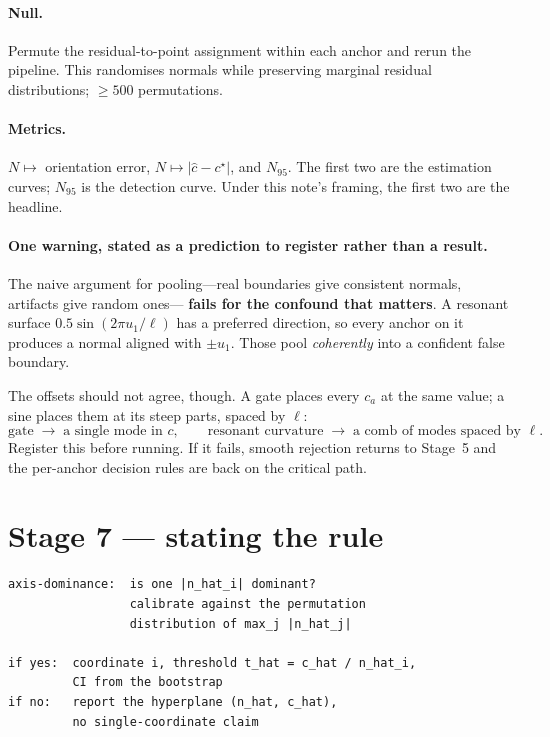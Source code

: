 \documentclass[11pt]{article}
\newcommand{\chat}{\hat{c}}
\begin{document}
\paragraph{Null.} Permute the residual-to-point assignment within each anchor and rerun the
pipeline. This randomises normals while preserving marginal residual distributions;
$\ge 500$ permutations.

\paragraph{Metrics.} $N \mapsto$ orientation error, $N \mapsto |\chat - c^\star|$, and $N_{95}$.
The first two are the estimation curves; $N_{95}$ is the detection curve. Under this note's
framing, the first two are the headline.

\paragraph{One warning, stated as a prediction to register rather than a result.} The naive
argument for pooling---real boundaries give consistent normals, artifacts give random ones---
\textbf{fails for the confound that matters}. A resonant surface $0.5\sin(2\pi u_1/\ell)$ has a
preferred direction, so every anchor on it produces a normal aligned with $\pm u_1$. Those pool
\emph{coherently} into a confident false boundary.

The offsets should not agree, though. A gate places every $c_a$ at the same value; a sine places
them at its steep parts, spaced by $\ell$:
\[
  \text{gate} \;\longrightarrow\; \text{a single mode in } c,
  \qquad
  \text{resonant curvature} \;\longrightarrow\; \text{a comb of modes spaced by } \ell .
\]
Register this before running. If it fails, smooth rejection returns to Stage~5 and the per-anchor
decision rules are back on the critical path.

\section{Stage 7 --- stating the rule}
\label{sec:stage7}

\begin{codebox}
\begin{verbatim}
axis-dominance:  is one |n_hat_i| dominant?
                 calibrate against the permutation
                 distribution of max_j |n_hat_j|

if yes:  coordinate i, threshold t_hat = c_hat / n_hat_i,
         CI from the bootstrap
if no:   report the hyperplane (n_hat, c_hat),
         no single-coordinate claim
\end{verbatim}
\end{codebox}
\end{document}
